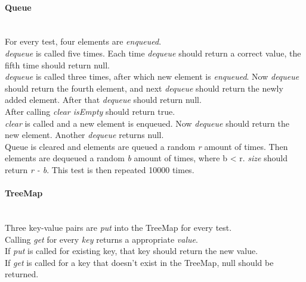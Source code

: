\documentclass[a4paper,12pt]{article}
\begin{document}
\paragraph{\large Queue} \hspace{0pt} \\
For every test, four elements are \emph{enqueued}.\\
\emph{dequeue} is called five times. Each time \emph{dequeue} should return a correct value, the fifth time should return null.\\
\emph{dequeue} is called three times, after which new element is \emph{enqueued}. Now \emph{dequeue} should return the fourth element, and next \emph{dequeue} should return the newly added element. After that \emph{dequeue} should return null.\\
After calling \emph{clear isEmpty} should return true.\\
\emph{clear} is called and a new element is enqueued.  Now \emph{dequeue} should return the new element. Another \emph{dequeue} returns null.\\
Queue is cleared and elements are queued a random \emph{r} amount of times. Then elements are dequeued a random \emph{b} amount of times, where b \textless{ r}. \emph{size} should return \emph{r - b}. This test is then repeated 10000 times.

\paragraph{\large TreeMap} \hspace{0pt} \\
Three key-value pairs are \emph{put} into the TreeMap for every test.\\
Calling \emph{get} for every \emph{key} returns a appropriate \emph{value}.\\
If \emph{put} is called for existing key, that key should return the new value.\\
If \emph{get} is called for a key that doesn't exist in the TreeMap, null should be returned.
\end{document}
